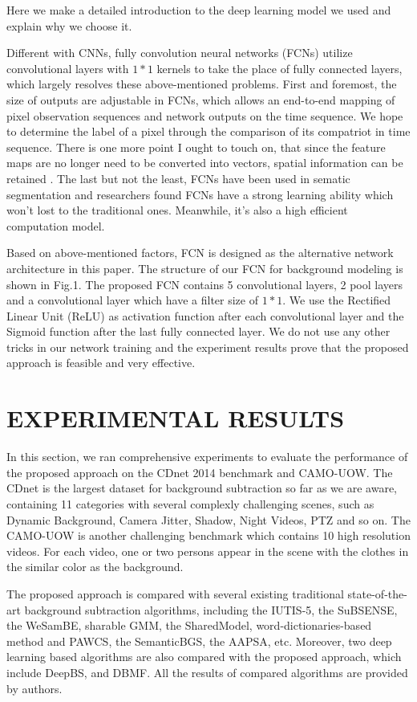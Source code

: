 \documentclass[runningheads,a4paper]{llncs}
\begin{document}
Here we make a detailed introduction to the deep learning model we used and explain why we choose it.

Different with CNNs, fully convolution neural networks (FCNs) utilize convolutional layers with $1*1$ kernels to take the place of fully connected layers, which largely resolves these above-mentioned problems. First and foremost, the size of outputs are adjustable in FCNs, which allows an end-to-end mapping of pixel observation sequences and network outputs on the time sequence. We hope to determine the label of a pixel through the comparison of its compatriot in time sequence. There is one more point I ought to touch on, that since the feature maps are no longer need to be converted into vectors, spatial information can be retained . The last but not the least, FCNs have been used in sematic segmentation and researchers found FCNs have a strong learning ability which won’t lost to the traditional ones. Meanwhile, it’s also a high efficient computation model. 

Based on above-mentioned factors, FCN is designed as the alternative network architecture in this paper. The structure of our FCN for background modeling is shown in Fig.1. The proposed FCN contains 5 convolutional layers, 2 pool layers and a convolutional layer which have a filter size of $1*1$. We use the Rectified Linear Unit (ReLU) as activation function after each convolutional layer and the Sigmoid function after the last fully connected layer. We do not use any other tricks in our network training and the experiment results prove that the proposed approach is feasible and very effective.

\section{EXPERIMENTAL RESULTS}

In this section, we ran comprehensive experiments to evaluate the performance of the proposed approach on the CDnet 2014 benchmark and CAMO-UOW. The CDnet is the largest dataset for background subtraction so far as we are aware, containing 11 categories with several complexly challenging scenes, such as Dynamic Background, Camera Jitter, Shadow, Night Videos, PTZ and so on. The CAMO-UOW is another challenging benchmark which contains 10 high resolution videos. For each video, one or two persons appear in the scene with the clothes in the similar color as the background.

The proposed approach is compared with several existing traditional state-of-the-art background subtraction algorithms, including the IUTIS-5, the SuBSENSE, the WeSamBE, sharable GMM, the SharedModel, word-dictionaries-based method and PAWCS, the SemanticBGS, the AAPSA, etc. Moreover, two deep learning based algorithms are also compared with the proposed approach, which include DeepBS, and DBMF. All the results of compared algorithms are provided by authors.
\end{document}
